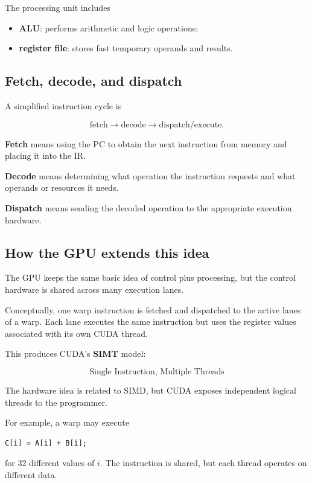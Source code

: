 \documentclass[11pt,a4paper]{article}
\begin{document}
The processing unit includes

\begin{itemize}
    \item \textbf{ALU}: performs arithmetic and logic operations;
    \item \textbf{register file}: stores fast temporary operands and results.
\end{itemize}

\subsection{Fetch, decode, and dispatch}

A simplified instruction cycle is

\[
\text{fetch}
\rightarrow
\text{decode}
\rightarrow
\text{dispatch/execute}.
\]

\textbf{Fetch} means using the PC to obtain the next instruction from memory and placing it into the IR.

\textbf{Decode} means determining what operation the instruction requests and what operands or resources it needs.

\textbf{Dispatch} means sending the decoded operation to the appropriate execution hardware.

\subsection{How the GPU extends this idea}

The GPU keeps the same basic idea of control plus processing, but the control hardware is shared across many execution lanes.

Conceptually, one warp instruction is fetched and dispatched to the active lanes of a warp. Each lane executes the same instruction but uses the register values associated with its own CUDA thread.

This produces CUDA's \textbf{SIMT} model:

\[
\boxed{
\text{Single Instruction, Multiple Threads}
}
\]

The hardware idea is related to SIMD, but CUDA exposes independent logical threads to the programmer.

For example, a warp may execute

\begin{lstlisting}
C[i] = A[i] + B[i];
\end{lstlisting}

for 32 different values of \(i\). The instruction is shared, but each thread operates on different data.
\end{document}
